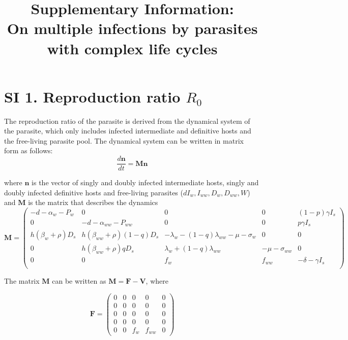 \documentclass[11pt]{article}
\title{Supplementary Information:\\ On multiple infections by parasites with complex life cycles}
\date{}
\begin{document}
\maketitle

\renewcommand{\theequation}{SI.\arabic{equation}}
\setcounter{equation}{0}

\renewcommand{\thefigure}{SI.\arabic{figure}}
\renewcommand{\thefigure}{SI.\arabic{figure}}
\setcounter{figure}{0}

\renewcommand{\thetable}{SI.\arabic{table}}
\setcounter{table}{0}

\section*{SI 1. Reproduction ratio $R_0$}

The reproduction ratio of the parasite is derived from the dynamical system of the parasite, which only includes infected intermediate and definitive hosts and the free-living parasite pool. The dynamical system can be written in matrix form as follows:
\[
\frac{d \mathbf{n}}{dt} = \mathbf{M} \mathbf{n}
\]

where $\mathbf{n}$ is the vector of singly and doubly infected intermediate hosts, singly and doubly infected definitive hosts and free-living parasites ($dI_w, I_{ww}, D_w, D_{ww}, W$) and $\mathbf{M}$ is the matrix that describes the dynamics
\[ \mathbf{M} = 
\begin{pmatrix}
- d - \alpha_w - P_w & 0 & 0 & 0 & (1 - p) \gamma I_s \\
0 & -d - \alpha_{ww} - P_{ww} & 0 & 0 & p \gamma I_s \\
h (\beta_w + \rho ) D_s &  h (\beta_{ww} + \rho) (1-q) D_s &-\lambda_w -   (1-q)\lambda_{ww}  -\mu -\sigma_w & 0 & 0 \\
0 &  h (\beta_{ww} + \rho ) q D_s  & \lambda_w +  (1-q) \lambda_{ww}  & -\mu - \sigma_{ww} & 0 \\
 0 & 0 & f_w & f_{ww} &- \delta - \gamma I_s  \\
\end{pmatrix}
\]

The matrix $\mathbf{M}$ can be written as $\mathbf{M} = \mathbf{F} - \mathbf{V}$, where

\[
\mathbf{F} = 
\begin{pmatrix}
0 & 0 & 0 & 0 & 0  \\
0 & 0 & 0 & 0 & 0  \\
0 & 0 & 0 & 0 & 0  \\
0 & 0 & 0 & 0 & 0  \\
0 & 0 & f_w & f_{ww} & 0
\end{pmatrix}
\]
\end{document}
